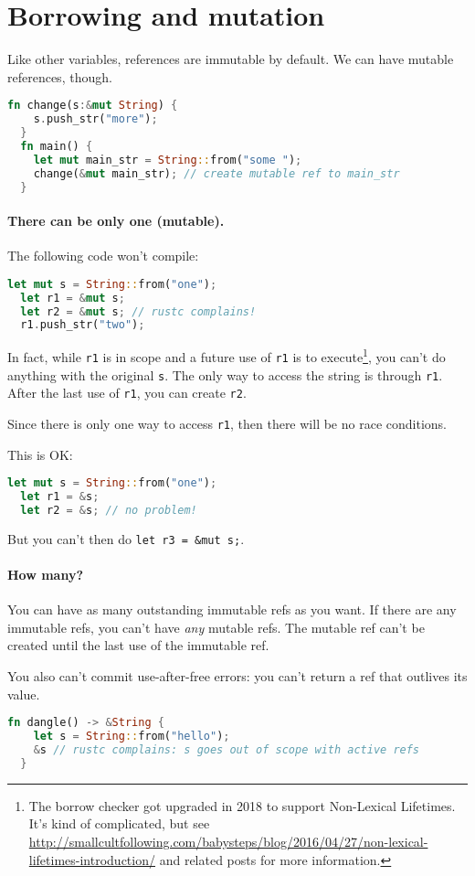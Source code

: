 \section*{Borrowing and mutation} Like other variables, references are immutable by default.
We can have mutable references, though.
\begin{lstlisting}[language=Rust]
  fn change(s:&mut String) {
    s.push_str("more");
  }
  fn main() {
    let mut main_str = String::from("some ");
    change(&mut main_str); // create mutable ref to main_str
  }
\end{lstlisting}

\paragraph{There can be only one (mutable).} The following code won't compile:
\begin{lstlisting}[language=Rust]
  let mut s = String::from("one");
  let r1 = &mut s;
  let r2 = &mut s; // rustc complains!
  r1.push_str("two");
\end{lstlisting}
In fact, while {\tt r1} is in scope and a future use of {\tt r1} is to execute\footnote{The borrow checker got upgraded in 2018 to support Non-Lexical Lifetimes. It's kind of complicated, but see \url{http://smallcultfollowing.com/babysteps/blog/2016/04/27/non-lexical-lifetimes-introduction/} and related posts for more information.},
you can't do anything with the original {\tt s}.
The only way to access the string is through {\tt r1}.
After the last use of {\tt r1},
you can create {\tt r2}.

Since there is only one way to access {\tt r1}, then there will be no race conditions.

This is OK:
\begin{lstlisting}[language=Rust]
  let mut s = String::from("one");
  let r1 = &s;
  let r2 = &s; // no problem!
\end{lstlisting}
But you can't then do {\tt let r3 = \&mut s;}.

\paragraph{How many?} You can have as many outstanding immutable refs as you want.
If there are any immutable refs, you can't have \emph{any} mutable refs. The mutable
ref can't be created until the last use of the immutable ref.

You also can't commit use-after-free errors: you can't return a ref that outlives
its value.
\begin{lstlisting}[language=Rust]
  fn dangle() -> &String {
    let s = String::from("hello");
    &s // rustc complains: s goes out of scope with active refs
  }
\end{lstlisting}

